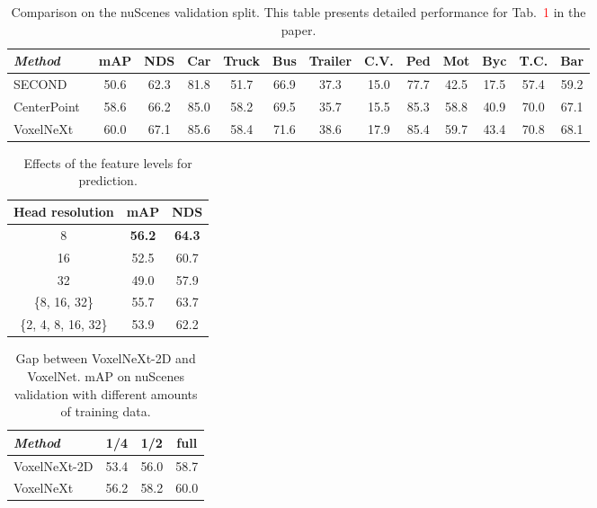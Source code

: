 \documentclass[10pt,twocolumn,letterpaper]{article}
\begin{document}
\begin{table*}[t]
\begin{center}
\caption{Comparison on the nuScenes validation split. This table presents detailed performance for Tab.~\textcolor{red}{1} in the paper.}
\begin{tabular}{|l|cc|cccccccccc|}
\hline
                   {\em Method}                 & mAP   & NDS & Car                  & Truck                & Bus                  & Trailer              & C.V.                   & Ped                  & Mot                  & Byc                  & T.C.                   & Bar                   \\ \hline
SECOND~\cite{second}   &  50.6 & 62.3 & 81.8 & 51.7 & 66.9 & 37.3 & 15.0 & 77.7 & 42.5 & 17.5 & 57.4 & 59.2 \\
CenterPoint~\cite{centerpoint}  & 58.6 & 66.2 & 85.0 & 58.2 & 69.5 & 35.7 & 15.5 & 85.3 & 58.8 & 40.9 & 70.0 & 67.1 \\
VoxelNeXt    & 60.0 & 67.1 & 85.6 & 58.4 & 71.6 & 38.6 & 17.9 & 85.4 & 59.7 & 43.4 & 70.8 & 68.1 \\  \hline
\end{tabular}\label{tab:nuscenes-validation}
\end{center}
\end{table*}
\begin{table}[t]
\begin{center}
\caption{Effects of the feature levels for prediction.}
\begin{tabular}{|c|cc|}
\hline
Head resolution   &   mAP    & NDS  \\ \hline
 8 & \textbf{56.2} & \textbf{64.3} \\
16 & 52.5 & 60.7 \\
32 & 49.0 & 57.9 \\
\{8, 16, 32\} & 55.7 & 63.7 \\
\{2, 4, 8, 16, 32\} & 53.9 & 62.2 \\
\hline
\end{tabular}
\label{tab:nuscenes-output-downsamples-ablation}
\end{center}
\end{table}
\begin{table}[t]
\begin{center}
\caption{Gap between VoxelNeXt-2D and VoxelNet. mAP on nuScenes validation with different amounts of training data.}
\begin{tabular}{|l|ccc|}
\hline
{\em Method} & 1/4  & 1/2  & full \\ \hline
VoxelNeXt-2D & 53.4  & 56.0  & 58.7 \\ \hline
VoxelNeXt    & 56.2 & 58.2 & 60.0 \\ \hline
\end{tabular}\label{tab:analysis-data-amount}
\end{center}
\end{table}
\end{document}
